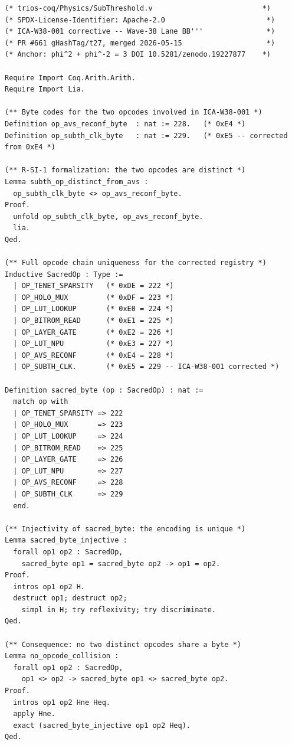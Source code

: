 \begin{lstlisting}[language=Coq,
  caption={Coq-лемма subth\_op\_distinct\_from\_avs
    из SubThreshold.v (ICA-W38-001 корректирующий коммит)},
  label={lst:coq_lemma}]
(* trios-coq/Physics/SubThreshold.v                          *)
(* SPDX-License-Identifier: Apache-2.0                        *)
(* ICA-W38-001 corrective -- Wave-38 Lane BB'''               *)
(* PR #661 gHashTag/t27, merged 2026-05-15                    *)
(* Anchor: phi^2 + phi^-2 = 3 DOI 10.5281/zenodo.19227877    *)

Require Import Coq.Arith.Arith.
Require Import Lia.

(** Byte codes for the two opcodes involved in ICA-W38-001 *)
Definition op_avs_reconf_byte  : nat := 228.   (* 0xE4 *)
Definition op_subth_clk_byte   : nat := 229.   (* 0xE5 -- corrected from 0xE4 *)

(** R-SI-1 formalization: the two opcodes are distinct *)
Lemma subth_op_distinct_from_avs :
  op_subth_clk_byte <> op_avs_reconf_byte.
Proof.
  unfold op_subth_clk_byte, op_avs_reconf_byte.
  lia.
Qed.

(** Full opcode chain uniqueness for the corrected registry *)
Inductive SacredOp : Type :=
  | OP_TENET_SPARSITY   (* 0xDE = 222 *)
  | OP_HOLO_MUX         (* 0xDF = 223 *)
  | OP_LUT_LOOKUP       (* 0xE0 = 224 *)
  | OP_BITROM_READ      (* 0xE1 = 225 *)
  | OP_LAYER_GATE       (* 0xE2 = 226 *)
  | OP_LUT_NPU          (* 0xE3 = 227 *)
  | OP_AVS_RECONF       (* 0xE4 = 228 *)
  | OP_SUBTH_CLK.       (* 0xE5 = 229 -- ICA-W38-001 corrected *)

Definition sacred_byte (op : SacredOp) : nat :=
  match op with
  | OP_TENET_SPARSITY => 222
  | OP_HOLO_MUX       => 223
  | OP_LUT_LOOKUP     => 224
  | OP_BITROM_READ    => 225
  | OP_LAYER_GATE     => 226
  | OP_LUT_NPU        => 227
  | OP_AVS_RECONF     => 228
  | OP_SUBTH_CLK      => 229
  end.

(** Injectivity of sacred_byte: the encoding is unique *)
Lemma sacred_byte_injective :
  forall op1 op2 : SacredOp,
    sacred_byte op1 = sacred_byte op2 -> op1 = op2.
Proof.
  intros op1 op2 H.
  destruct op1; destruct op2;
    simpl in H; try reflexivity; try discriminate.
Qed.

(** Consequence: no two distinct opcodes share a byte *)
Lemma no_opcode_collision :
  forall op1 op2 : SacredOp,
    op1 <> op2 -> sacred_byte op1 <> sacred_byte op2.
Proof.
  intros op1 op2 Hne Heq.
  apply Hne.
  exact (sacred_byte_injective op1 op2 Heq).
Qed.
\end{lstlisting}

